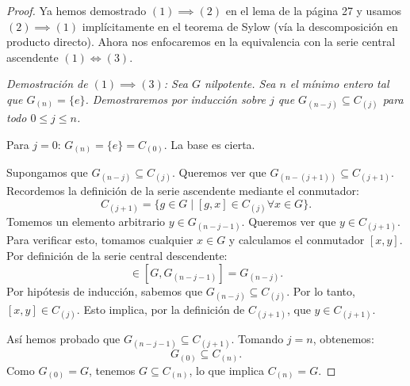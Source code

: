 
\begin{proof}
    Ya hemos demostrado $(1) \implies (2)$ en el lema de la página 27 y usamos $(2) \implies (1)$ implícitamente en el teorema de Sylow (vía la descomposición en producto directo). Ahora nos enfocaremos en la equivalencia con la serie central ascendente $(1) \iff (3)$.

    \itshape Demostración de $(1) \implies (3)$: \normalfont
    Sea $G$ nilpotente. Sea $n$ el mínimo entero tal que $G_{(n)} = \{e\}$.
    Demostraremos por inducción sobre $j$ que $G_{(n-j)} \subseteq C_{(j)}$ para todo $0 \le j \le n$.
    
    Para $j=0$: $G_{(n)} = \{e\} = C_{(0)}$. La base es cierta.
    
    Supongamos que $G_{(n-j)} \subseteq C_{(j)}$. Queremos ver que $G_{(n-(j+1))} \subseteq C_{(j+1)}$.
    Recordemos la definición de la serie ascendente mediante el conmutador:
    \begin{equation*}
        C_{(j+1)} = \{ g \in G \mid [g, x] \in C_{(j)} \forall x \in G \}.
    \end{equation*}
    Tomemos un elemento arbitrario $y \in G_{(n-j-1)}$. Queremos ver que $y \in C_{(j+1)}$.
    Para verificar esto, tomamos cualquier $x \in G$ y calculamos el conmutador $[x, y]$.
    Por definición de la serie central descendente:
    \begin{equation*}
        [x, y] \in [G, G_{(n-j-1)}] = G_{(n-j)}.
    \end{equation*}
    Por hipótesis de inducción, sabemos que $G_{(n-j)} \subseteq C_{(j)}$.
    Por lo tanto, $[x, y] \in C_{(j)}$.
    Esto implica, por la definición de $C_{(j+1)}$, que $y \in C_{(j+1)}$.
    
    Así hemos probado que $G_{(n-j-1)} \subseteq C_{(j+1)}$.
    Tomando $j=n$, obtenemos:
    \begin{equation*}
        G_{(0)} \subseteq C_{(n)}.
    \end{equation*}
    Como $G_{(0)} = G$, tenemos $G \subseteq C_{(n)}$, lo que implica $C_{(n)} = G$.


\end{proof}
